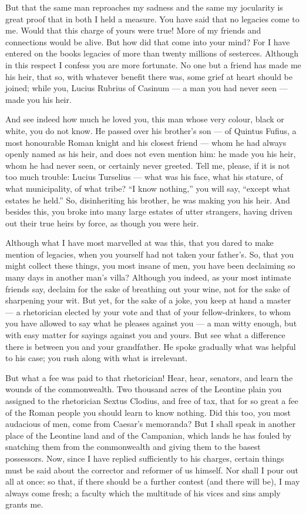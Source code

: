  But that the same man reproaches my sadness and the same my jocularity is great proof that in both I held a measure. You have said that no legacies come to me. Would that this charge of yours were true! More of my friends and connections would be alive. But how did that come into your mind? For I have entered on the books legacies of more than twenty millions of sesterces. Although in this respect I confess you are more fortunate. No one but a friend has made me his heir, that so, with whatever benefit there was, some grief at heart should be joined; while you, Lucius Rubrius of Casinum --- a man you had never seen --- made you his heir.

 And see indeed how much he loved you, this man whose very colour, black or white, you do not know. He passed over his brother's son --- of Quintus Fufius, a most honourable Roman knight and his closest friend --- whom he had always openly named as his heir, and does not even mention him: he made you his heir, whom he had never seen, or certainly never greeted. Tell me, please, if it is not too much trouble: Lucius Turselius --- what was his face, what his stature, of what municipality, of what tribe? ``I know nothing,'' you will say, ``except what estates he held.'' So, disinheriting his brother, he was making you his heir. And besides this, you broke into many large estates of utter strangers, having driven out their true heirs by force, as though you were heir.

 Although what I have most marvelled at was this, that you dared to make mention of legacies, when you yourself had not taken your father's. So, that you might collect these things, you most insane of men, you have been declaiming so many days in another man's villa? Although you indeed, as your most intimate friends say, declaim for the sake of breathing out your wine, not for the sake of sharpening your wit. But yet, for the sake of a joke, you keep at hand a master --- a rhetorician elected by your vote and that of your fellow-drinkers, to whom you have allowed to say what he pleases against you --- a man witty enough, but with easy matter for sayings against you and yours. But see what a difference there is between you and your grandfather. He spoke gradually what was helpful to his case; you rush along with what is irrelevant.

 But what a fee was paid to that rhetorician! Hear, hear, senators, and learn the wounds of the commonwealth. Two thousand acres of the Leontine plain you assigned to the rhetorician Sextus Clodius, and free of tax, that for so great a fee of the Roman people you should learn to know nothing. Did this too, you most audacious of men, come from Caesar's memoranda? But I shall speak in another place of the Leontine land and of the Campanian, which lands he has fouled by snatching them from the commonwealth and giving them to the basest possessors. Now, since I have replied sufficiently to his charges, certain things must be said about the corrector and reformer of us himself. Nor shall I pour out all at once: so that, if there should be a further contest (and there will be), I may always come fresh; a faculty which the multitude of his vices and sins amply grants me.

